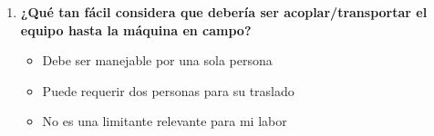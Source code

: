 \documentclass[11pt,a4paper]{article}
\begin{document}
\begin{enumerate}[resume=encuesta, leftmargin=*]
    \item \textbf{¿Qué tan fácil considera que debería ser acoplar/transportar el equipo hasta la máquina en campo?}
    \begin{itemize}[label=$\square$, leftmargin=*]
        \item Debe ser manejable por una sola persona
        \item Puede requerir dos personas para su traslado
        \item No es una limitante relevante para mi labor
    \end{itemize}
\end{enumerate}
\end{document}

